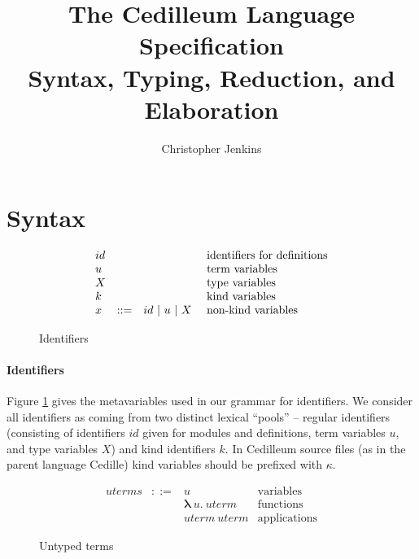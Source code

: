 \documentclass{article}
\begin{document}
\title{The Cedilleum Language Specification \\ \large Syntax, Typing, Reduction,
  and Elaboration }

\author{Christopher Jenkins}

\maketitle

\section{Syntax}

\begin{figure}[h]
  \[
    \begin{array}{llll}
      id & &
      & \textnormal{identifiers for definitions}
      \\ u & &
      & \textnormal{term variables}
      \\ X & &
      & \textnormal{type variables}
      \\ k & &
      & \textnormal{kind variables}
      \\ x & ::= & id\ |\ u\ |\ X\
      & \textnormal{non-kind variables}
    \end{array}
  \]
  \caption{Identifiers}
  \label{fig:identifiers}
\end{figure}

\paragraph{Identifiers}
Figure \ref{fig:identifiers} gives the metavariables used in our grammar for
identifiers. We consider all identifiers as coming from two distinct lexical
``pools'' -- regular identifiers (consisting of identifiers $id$ given for
modules and definitions, term variables $u$, and type variables $X$) and kind
identifiers $k$. In Cedilleum source files (as in the parent language Cedille)
kind variables should be prefixed with $\kappa$.

\begin{figure}[h]
  \[
    \begin{array}{llll}
      uterms
      & ::= & u
      & \text{variables}
      \\ & & \textbf{λ}\ u \textbf{.}\ uterm
      & \text{functions}
      \\ & & uterm\ uterm
      & \text{applications}
    \end{array}
  \]
  \caption{Untyped terms}
  \label{fig:pure-terms}
\end{figure}
\end{document}
